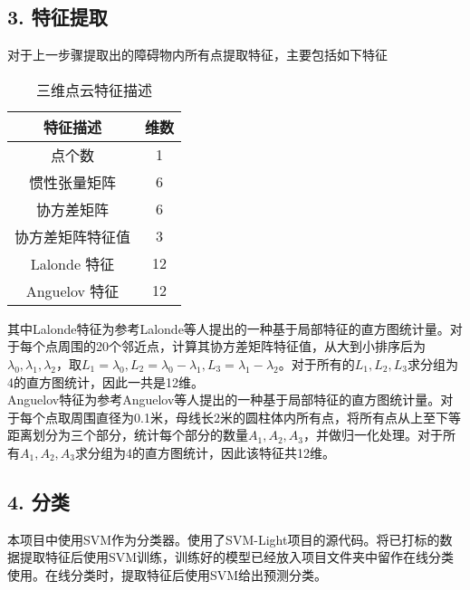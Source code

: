 \documentclass[12pt]{article}
\begin{document}
  	\subsection*{3. 特征提取}
  		对于上一步骤提取出的障碍物内所有点提取特征\cite{1}，主要包括如下特征
  		 \begin{table}[h!]
  			\begin{center}
  				\caption{三维点云特征描述}
  				\begin{tabular}{c|c}
  					\toprule
  					\textbf{特征描述} & \textbf{维数}\\
  					\midrule
  					点个数 & 1\\
  					惯性张量矩阵 & 6\\
  					协方差矩阵 & 6\\
  					协方差矩阵特征值 & 3\\
  					Lalonde 特征 & 12\\
  					Anguelov 特征 & 12\\
  					\bottomrule
  				\end{tabular}
  			\end{center}
  		\end{table}
  		其中Lalonde特征为参考Lalonde等人\cite{2}提出的一种基于局部特征的直方图统计量。对于每个点周围的20个邻近点，计算其协方差矩阵特征值，从大到小排序后为$\lambda_0, \lambda_1, \lambda_2$，取$L_1=\lambda_0,L_2=\lambda_0-\lambda_1,L_3=\lambda_1-\lambda_2$。对于所有的$L_1,L_2,L_3$求分组为4的直方图统计，因此一共是12维。\\
  		Anguelov特征为参考Anguelov等人\cite{3}提出的一种基于局部特征的直方图统计量。对于每个点取周围直径为0.1米，母线长2米的圆柱体内所有点，将所有点从上至下等距离划分为三个部分，统计每个部分的数量$A_1,A_2,A_3$，并做归一化处理。对于所有$A_1,A_2,A_3$求分组为4的直方图统计，因此该特征共12维。
  	\subsection*{4. 分类}
  		本项目中使用SVM作为分类器。使用了SVM-Light项目\cite{4}的源代码。将已打标的数据提取特征后使用SVM训练，训练好的模型已经放入项目文件夹中留作在线分类使用。在线分类时，提取特征后使用SVM给出预测分类。
\end{document}
